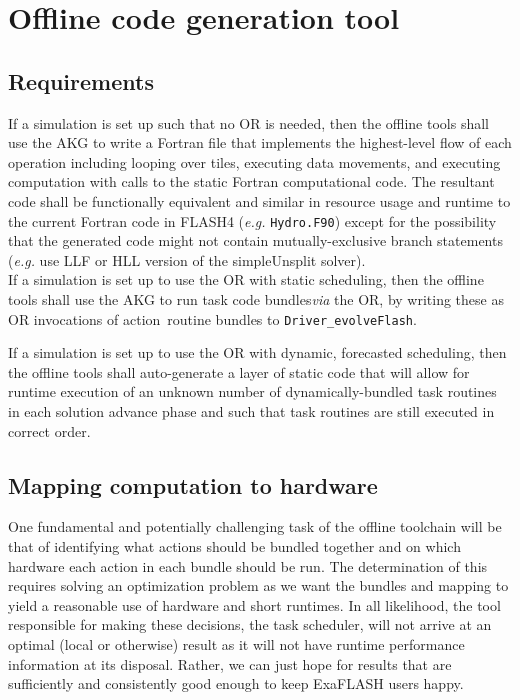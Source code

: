 \documentclass{article}
\newcommand{\FlashOfTheFuture}{ExaFLASH\xspace}
\newcommand{\Jared}[1]          {\textcolor{cyan}{Jared: #1}}
\newcommand{\shortAKG}   {AKG\xspace}
\newcommand{\shortOR}   {OR\xspace}
\newcommand{\AKG}    {\shortAKG}
\newcommand{\OR}        {\shortOR}
\newcommand{\taskcodebundles}    {task code bundles\xspace}
\newcommand{\qsaa}                   {action\ }                 %
\newcommand{\actionroutinebundles} {\qsaa routine bundles\xspace} %
\newcommand{\taskroutine}        {task routine\xspace}
\newcommand{\taskroutines}       {task routines\xspace}
\begin{document}

\section{Offline code generation tool}
\subsection{Requirements}
If a simulation is set up such that no \OR is needed, then the offline tools
shall use the \AKG to write a Fortran file that implements the
highest-level flow of each operation including looping over tiles, executing
data movements, and executing computation with calls to the static Fortran
computational code.  The resultant code shall be functionally equivalent and
similar in resource usage and runtime to the current Fortran code in FLASH4
(\textit{e.g.} \texttt{Hydro.F90}) except for the possibility that the generated
code might not contain mutually-exclusive branch statements (\textit{e.g.} use
LLF or HLL version of the simpleUnsplit solver).\\

If a simulation is set up to use the \OR with static scheduling, then the
offline tools shall use the \AKG to run \taskcodebundles \textit{via}
the \OR, by writing these as \OR invocations of \actionroutinebundles to \texttt{Driver\_evolveFlash}.

If a simulation is set up to use the \OR with dynamic, forecasted scheduling,
then the offline tools shall auto-generate a layer of static code that will
allow for runtime execution of an unknown number of dynamically-bundled
\taskroutines in each solution advance phase and such that \taskroutines are still executed in correct order.

\subsection{Mapping computation to hardware}
\label{sec:OptimizationPhaseTool}
One fundamental and potentially challenging task of the offline toolchain will
be that of identifying what actions should be bundled together and on which
hardware each action in each bundle should be run.  The determination of this
requires solving an optimization problem as we want the bundles and mapping to
yield a reasonable use of hardware and short runtimes.  In all likelihood, the
tool responsible for making these decisions, the task scheduler, will not arrive
at an optimal (local or otherwise) result as it will not have runtime
performance information at its disposal.  Rather, we can just hope for results
that are sufficiently and consistently good enough to keep \FlashOfTheFuture
users happy.\\
\end{document}

